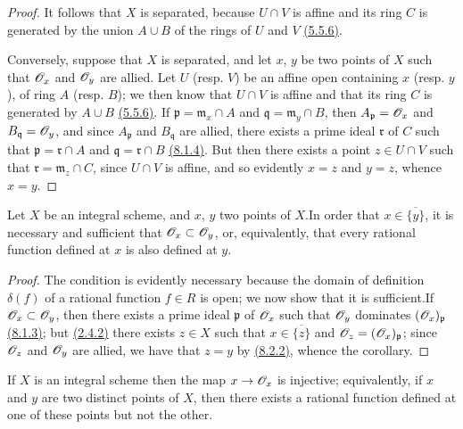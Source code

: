 \begin{proof}
It follows that $X$ is separated, because $U\cap V$ is affine and its ring $C$
is generated by the union $A\cup B$ of the rings of $U$ and $V$ \hyperref[env-1.5.5.6]{(5.5.6)}.

Conversely, suppose that $X$ is separated, and let $x$, $y$ be two points of $X$
such that $\mathscr{O}_x$ and $\mathscr{O}_y$ are allied. Let $U$ (resp. $V$) be an affine open
containing $x$ (resp. $y$), of ring $A$ (resp. $B$); we then know that $U\cap V$
is affine and that its ring $C$ is generated by $A\cup B$ \hyperref[env-1.5.5.6]{(5.5.6)}. If
$\mathfrak{p}=\mathfrak{m}_x\cap A$ and $\mathfrak{q}=\mathfrak{m}_y\cap B$,
then $A_\mathfrak{p}=\mathscr{O}_x$ and $B_\mathfrak{q}=\mathscr{O}_y$, and since $A_\mathfrak{p}$
and $B_\mathfrak{q}$ are allied, there exists a prime ideal $\mathfrak{r}$ of
$C$ such that $\mathfrak{p}=\mathfrak{r}\cap A$ and
$\mathfrak{q}=\mathfrak{r}\cap B$ \hyperref[lem-1.8.1.4]{(8.1.4)}. But then there exists a point
$z\in U\cap V$ such that $\mathfrak{r}=\mathfrak{m}_z\cap C$, since $U\cap V$ is
affine, and so evidently $x=z$ and $y=z$, whence $x=y$.
\end{proof}

\begin{cor}[8.2.3]
\label{cor-1.8.2.3}
Let $X$ be an integral scheme, and $x$, $y$ two
points of $X$.In order that $x\in\overline{\{y\}}$, it is necessary and
sufficient that $\mathscr{O}_x\subset\mathscr{O}_y$, or, equivalently, that every rational
function defined at $x$ is also defined at $y$.
\end{cor}

\begin{proof}
\label{proof-cor-1.8.2.3}
The condition is evidently necessary because the domain of definition
$\delta(f)$ of a rational function $f\in R$ is open; we now show that it is
sufficient.If $\mathscr{O}_x\subset\mathscr{O}_y$, then there exists a prime ideal
$\mathfrak{p}$ of $\mathscr{O}_x$ such that $\mathscr{O}_y$ dominates $(\mathscr{O}_x)_\mathfrak{p}$
\hyperref[lem-1.8.1.3]{(8.1.3)}; but \hyperref[prop-1.2.4.2]{(2.4.2)} there exists $z\in X$ such that
$x\in\overline{\{z\}}$ and $\mathscr{O}_z=(\mathscr{O}_x)_\mathfrak{p}$; since $\mathscr{O}_z$ and $\mathscr{O}_y$
are allied, we have that $z=y$ by \hyperref[prop-1.8.2.2]{(8.2.2)}, whence the corollary.
\end{proof}

\begin{cor}[8.2.4]
\label{cor-1.8.2.4}
If $X$ is an integral scheme then the map
$x\to\mathscr{O}_x$ is injective; equivalently, if $x$ and $y$ are two distinct points of
$X$, then there exists a rational function defined at one of these points but
not the other.
\end{cor}

